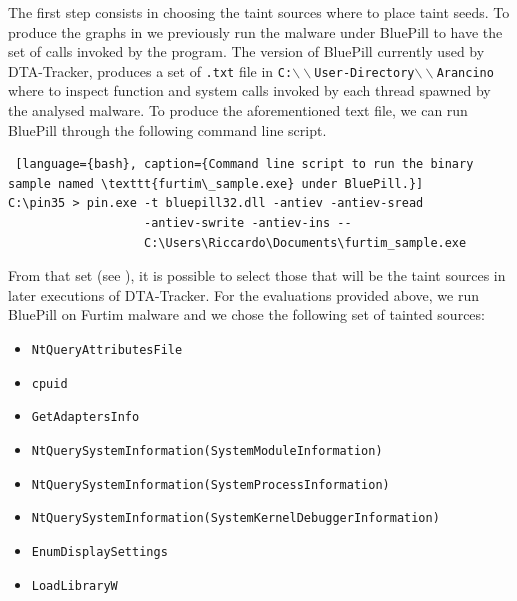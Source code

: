 \documentclass[LaM,binding=0.6cm]{sapthesis}
\begin{document}
The first step consists in choosing the taint sources where to place taint seeds. To produce the graphs in we previously run the malware under BluePill to have the set of calls invoked by the program. The version of BluePill currently used by DTA-Tracker, produces a set of \texttt{.txt} file in \texttt{C:$\backslash\backslash$User-Directory$\backslash\backslash$Arancino} where to inspect function and system calls invoked by each thread spawned by the analysed malware. To produce the aforementioned text file, we can run BluePill through the following command line script.
\begin{lstlisting} [language={bash}, caption={Command line script to run the binary sample named \texttt{furtim\_sample.exe} under BluePill.}]
C:\pin35 > pin.exe -t bluepill32.dll -antiev -antiev-sread 
				   -antiev-swrite -antiev-ins -- 
				   C:\Users\Riccardo\Documents\furtim_sample.exe
\end{lstlisting}

From that set (see ), it is possible to select those that will be the taint sources in later executions of DTA-Tracker. For the evaluations provided above, we run BluePill on Furtim malware and we chose the following set of tainted sources:
\begin{itemize}
\item \texttt{NtQueryAttributesFile}
\item \texttt{cpuid}
\item \texttt{GetAdaptersInfo}
\item \texttt{NtQuerySystemInformation(SystemModuleInformation)}
\item \texttt{NtQuerySystemInformation(SystemProc\-essInformation)}
\item \texttt{NtQuerySystemInformation(SystemKernelDebuggerInformation)}
\item \texttt{EnumDisplaySettings}
\item \texttt{LoadLibraryW}
\end{itemize}
\end{document}
